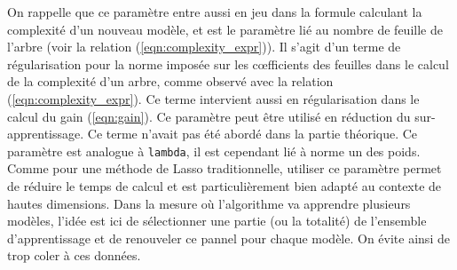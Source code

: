 On rappelle que ce paramètre entre aussi en jeu dans la formule calculant la complexité d'un nouveau modèle, et est le paramètre lié au nombre de feuille de l'arbre (voir la relation (\ref{eqn:complexity_expr})).
Il s'agit d'un terme de régularisation pour la norme imposée sur les c\oe fficients des feuilles dans le calcul de la complexité d'un arbre, comme observé avec la relation (\ref{eqn:complexity_expr}). Ce terme intervient aussi en régularisation dans le calcul du gain (\ref{eqn:gain}). Ce paramètre peut être utilisé en réduction du sur-apprentissage.
Ce terme n'avait pas été abordé dans la partie théorique. Ce paramètre est analogue à \texttt{lambda}, il est cependant lié à norme un des poids. Comme pour une méthode de Lasso traditionnelle, utiliser ce paramètre permet de réduire le temps de calcul et est particulièrement bien adapté au contexte de hautes dimensions.
Dans la mesure où l'algorithme va apprendre plusieurs modèles, l'idée est ici de sélectionner une partie (ou la totalité) de l'ensemble d'apprentissage et de renouveler ce pannel pour chaque modèle. On évite ainsi de trop coler à ces données.

